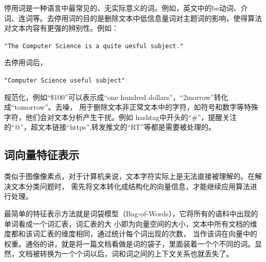 停用词是一种语言中最常见的、无实际意义的词。例如，英文中的be动词、介词、连词等。去停用词的目的是删除文本中低信息量词对主题词的影响，使得算法对文本内容有更强的辨别性。例如：
\par\hspace{5em}\verb|"The Computer Science is a quite uesful subject."|\par

去停用词后，
\par\hspace{5em}\verb|"Computer Science useful subject"|\par

规范化，例如“\$100”可以表示成“one hundred dollars”，“2morrow”转化成“tomorrow”。去噪，
用于删除文本非正常文本中的字符，如符号和数字等特殊字符，他们会对文本分析产生干扰。例如
hashtag中开头的“\#”，提醒关注的“@”，超文本链接“https”,转发推文的“RT”等都是需要被处理的。%


\subsection{词向量特征表示}
类似于图像像素点，对于计算机来说，文本字符实际上是无法直接被理解的。在解决文本分类问题时，
需先将文本转化成结构化的向量信息，才能继续应用算法进行处理。

最简单的特征表示方法就是词袋模型（Bag-of-Words）\cite{zhang2010understanding}，它将所有的语料中出现的单词看成一个词汇表，词汇表的大
小即为向量空间的大小，文本中所有文档的维度都和该词汇表的维度相同，通过统计每个词出现的次数，
当作该词在向量中的权重。通俗的讲，就是将一篇文档看做是词的袋子，里面装着一个个不同的词。显
然，文档被转换为一个个词以后，词和词之间的上下文关系也就丢失了。

